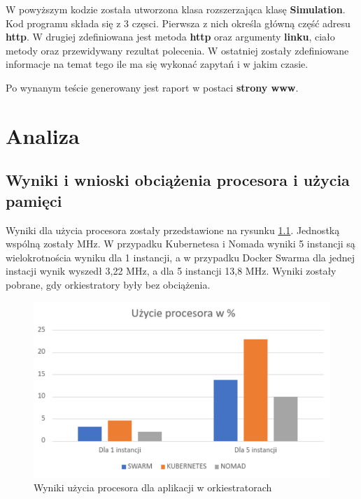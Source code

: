 \documentclass{iiuwb}
\begin{document}
W powyższym kodzie została utworzona klasa rozszerzająca klasę \textbf{Simulation}. Kod programu składa się z 3 częsci. Pierwsza z nich określa główną część adresu \textbf{http}. W drugiej zdefiniowana jest metoda \textbf{http} oraz argumenty \textbf{linku}, ciało metody oraz przewidywany rezultat polecenia. W ostatniej zostały zdefiniowane informacje na temat tego ile ma się wykonać zapytań i w jakim czasie. 
\newline

Po wynanym teście generowany jest raport w postaci \textbf{strony www}.  

\cleardoublepage
\chapter{Analiza}
\label{cha:Analiza Wynikow}

\section{Wyniki i wnioski obciążenia procesora i użycia pamięci}
\label{sec:Zarzadzanie zasobami}

Wyniki dla użycia procesora zostały przedstawione na rysunku 
\ref{fig: Uzycie procesora}. Jednostką wspólną zostały MHz. 
W przypadku Kubernetesa i Nomada wyniki 5 instancji są 
wielokrotnościa wyniku dla 1 instancji, a w przypadku Docker 
Swarma dla jednej instacji wynik wyszedł 3,22 MHz, a dla 
5 instancji 13,8 MHz. Wyniki zostały pobrane, gdy orkiestratory 
były bez obciążenia.

\begin{figure}[!h]
  \centering
  \includegraphics[width=12cm]{uzycieProcesora.pdf}
  \caption{Wyniki użycia procesora dla aplikacji w orkiestratorach}
  \label{fig: Uzycie procesora}
\end{figure}
\end{document}
